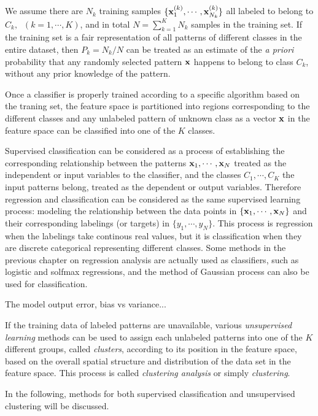 \documentclass{article}
\begin{document}
We assume there are $N_k$ training samples 
$\{{\bf x}_1^{(k)},\cdots,{\bf x}_{N_k}^{(k)}\}$ all labeled to belong 
to $C_k,\;\;(k=1,\cdots,K)$, and in total $N=\sum_{k=1}^K N_k$ samples in 
the training set. If the training set is a fair representation of all 
patterns of different classes in the entire dataset, then $P_k=N_k/N$ can 
be treated as an estimate of the {\em a priori} probability that any 
randomly selected pattern ${\bf x}$ happens to belong to class $C_k$, 
without any prior knowledge of the pattern.

Once a classifier is properly trained according to a specific algorithm 
based on the traning set, the feature space is partitioned into regions 
corresponding to the different classes and any unlabeled pattern of unknown 
class as a vector ${\bf x}$ in the feature space can be classified into 
one of the $K$ classes. 

Supervised classification can be considered as a process of 
establishing the corresponding relationship between the patterns 
${\bf x}_1,\cdots, {\bf x}_N$ treated as the independent or input 
variables to the classifier, and the classes $C_1,\cdots,C_K$ the 
input patterns belong, treated as the dependent or output variables.
Therefore regression and classification can be considered as the
same supervised learning process: modeling the relationship between 
the data points in $\{ {\bf x}_1,\cdots,{\bf x}_N\}$ and their 
corresponding labelings (or targets) in $\{ y_1,\cdots,y_N\}$. This
process is regression when the labelings take continous real values, 
but it is classification when they are discrete categorical 
representing different classes. Some methods in the previous chapter
on regression analysis are actually used as classifiers, such as 
logistic and solfmax regressions, and the method of Gaussian process 
can also be used for classification.

The model output error, bias vs variance...


If the training data of labeled patterns are unavailable, various
{\em unsupervised learning} methods can be used to assign each unlabeled 
patterns into one of the $K$ different groups, called {\em clusters}, 
according to its position in the feature space, based on the overall
spatial structure and distribution of the data set in the feature
space. This process is called {\em clustering analysis} or simply 
{\em clustering}. 

In the following, methods for both supervised classification and 
unsupervised clustering will be discussed.
\end{document}
